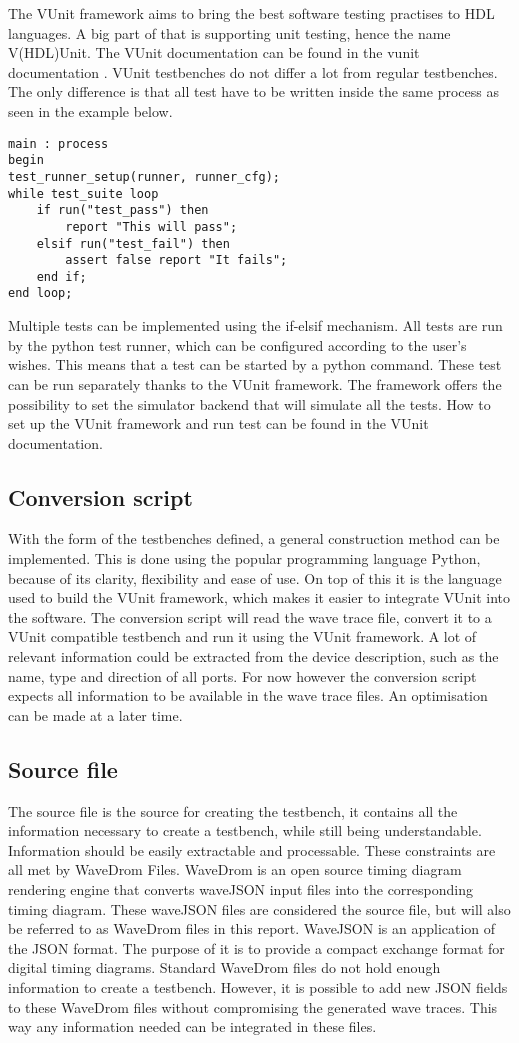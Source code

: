 \npar
The VUnit framework aims to bring the best software testing practises to HDL languages. A big part of that is supporting unit testing, hence the name V(HDL)Unit. The VUnit documentation can be found in the vunit documentation \cite{vunit_doc}. VUnit testbenches do not differ a lot from regular testbenches. The only difference is that all test have to be written inside the same process as seen in the example below.
\begin{lstlisting}[style=vhdl, caption={Main test loop for a VUnit testbench}]
main : process
begin
test_runner_setup(runner, runner_cfg);
while test_suite loop
	if run("test_pass") then
		report "This will pass";
	elsif run("test_fail") then
		assert false report "It fails";
	end if;
end loop;
\end{lstlisting}\noindent
Multiple tests can be implemented using the if-elsif mechanism. All tests are run by the python test runner, which can be configured according to the user's wishes. This means that a test can be started by a python command. These test can be run separately thanks to the VUnit framework. The framework offers the possibility to set the simulator backend that will simulate all the tests. How to set up the VUnit framework and run test can be found in the VUnit documentation.
\subsection{Conversion script}
With the form of the testbenches defined, a general construction method can be implemented. This is done using the popular programming language Python, because of its clarity, flexibility and ease of use. On top of this it is the language used to build the VUnit framework, which makes it easier to integrate VUnit into the software.
\npar
The conversion script will read the wave trace file, convert it to a VUnit compatible testbench and run it using the VUnit framework.
\npar
A lot of relevant information could be extracted from the device description, such as the name, type and direction of all ports. For now however the conversion script expects all information to be available in the wave trace files. An optimisation can be made at a later time.
\subsection{Source file}
The source file is the source for creating the testbench, it contains all the information necessary to create a testbench, while still being understandable. Information should be easily extractable and processable. These constraints are all met by WaveDrom Files.
\npar
WaveDrom is an open source timing diagram rendering engine that converts waveJSON input files into the corresponding timing diagram. These waveJSON files are considered the source file, but will also be referred to as WaveDrom files in this report.
\npar
WaveJSON \cite{wavejson}
 is an application of the JSON format. The purpose of it is to provide a compact exchange format for digital timing diagrams.
\npar
Standard WaveDrom files do not hold enough information to create a testbench. However, it is possible to add new JSON fields to these WaveDrom files without compromising the generated wave traces. This way any information needed can be integrated in these files.
